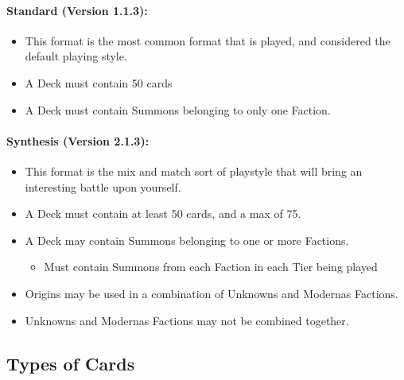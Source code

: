 \documentclass[12pt, letterpaper]{article}
\begin{document}
\paragraph{Standard (Version 1.1.3): \\}
\begin{itemize}
    \item This format is the most common format that is played, and considered the default playing style. 
    \item A Deck must contain 50 cards 
    \item A Deck must contain Summons belonging to only one Faction. 
\end{itemize}
\paragraph{Synthesis (Version 2.1.3): \\}
\begin{itemize}
    \item This format is the mix and match sort of playstyle that will bring an interesting battle upon yourself. 
    \item A Deck must contain at least 50 cards, and a max of 75. 
    \item A Deck may contain Summons belonging to one or more Factions. 
        \begin{itemize}
            \item Must contain Summons from each Faction in each Tier being played
        \end{itemize}
    \item Origins may be used in a combination of Unknowns and Modernas Factions. 
    \item Unknowns and Modernas Factions may not be combined together. 
\end{itemize}
\newpage
\subsection{Types of Cards}
\end{document}

